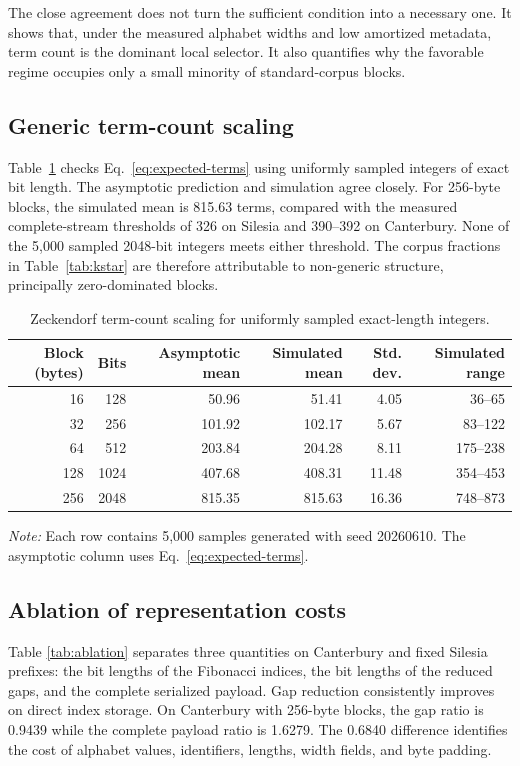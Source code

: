 \documentclass[a4paper,fleqn]{cas-dc}
\newcommand{\tablenote}[1]{%
  \par\smallskip
  \begin{minipage}{0.98\linewidth}
  \footnotesize\textit{Note:} #1
  \end{minipage}}
\begin{document}
The close agreement does not turn the sufficient condition into a necessary
one. It shows that, under the measured alphabet widths and low amortized
metadata, term count is the dominant local selector. It also quantifies why
the favorable regime occupies only a small minority of standard-corpus
blocks.

\subsection{Generic term-count scaling}

Table~\ref{tab:term-scaling} checks Eq.~\eqref{eq:expected-terms} using
uniformly sampled integers of exact bit length. The asymptotic prediction and
simulation agree closely. For 256-byte blocks, the simulated mean is 815.63
terms, compared with the measured complete-stream thresholds of 326 on
Silesia and 390--392 on Canterbury. None of the 5,000 sampled 2048-bit
integers meets either threshold. The corpus fractions in
Table~\ref{tab:kstar} are therefore attributable to non-generic structure,
principally zero-dominated blocks.

\begin{table}[t]
\caption{Zeckendorf term-count scaling for uniformly sampled exact-length integers.}
\label{tab:term-scaling}
\centering
\begin{tabular}{rrrrrr}
\toprule
Block (bytes) & Bits & Asymptotic mean & Simulated mean & Std. dev. &
Simulated range\\
\midrule
16  & 128  & 50.96  & 51.41  & 4.05  & 36--65\\
32  & 256  & 101.92 & 102.17 & 5.67  & 83--122\\
64  & 512  & 203.84 & 204.28 & 8.11  & 175--238\\
128 & 1024 & 407.68 & 408.31 & 11.48 & 354--453\\
256 & 2048 & 815.35 & 815.63 & 16.36 & 748--873\\
\bottomrule
\end{tabular}
\tablenote{Each row contains 5,000 samples generated with seed 20260610.
The asymptotic column uses Eq.~\eqref{eq:expected-terms}.}
\end{table}

\subsection{Ablation of representation costs}

Table \ref{tab:ablation} separates three quantities on Canterbury and fixed
Silesia prefixes: the bit lengths of the Fibonacci indices, the bit lengths of
the reduced gaps, and the complete
serialized payload. Gap reduction consistently improves on direct index
storage. On Canterbury with 256-byte blocks, the gap ratio is 0.9439 while the
complete payload ratio is 1.6279. The 0.6840 difference identifies the cost of
alphabet values, identifiers, lengths, width fields, and byte padding.
\end{document}

